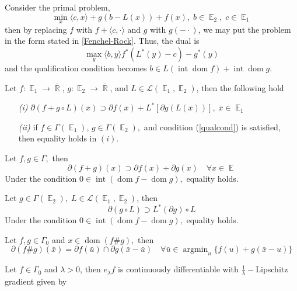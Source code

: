 \documentclass{tufte-handout}
\DeclareMathOperator{\dom}{dom}
\DeclareMathOperator{\argmin}{argmin}
\DeclareMathOperator{\R}{\mathbb{R}}
\DeclareMathOperator{\E}{\mathbb{E}}
\begin{document}
{{\begin{remark}
\end{remark}
\begin{example} Consider the primal problem, 
  $$\min_x \langle c,x \rangle + g(b - L(x)) + f(x), \; b \in \E_2, \; c \in \E_1 $$
  then by replacing $f$ with $f + \langle c , \cdot \rangle $ and $g$ with $g( - \cdot {} )$, we may put the problem in the form stated in \ref{Fenchel-Rock}. Thus, the dual is 
  $$\max_y \langle b,y \rangle  f^* (L^* (y) -c)- g^*(y) $$
  and the qualification condition becomes $b \in L(\operatorname{int}\dom f) + \operatorname{int}\dom g.  $
\end{example}
\begin{theorem} \label{sumrule}
  Let $f : \E_1 \to \overline{\R}$, $g: \E_2 \to \overline{\R}$, and $L \in \mathcal{L}(\E_1, \E_2)$, then the following hold
  \begin{enumerate}
    \item[\it (i)] $\partial( f + g \circ L) (\bar x) \supset \partial f(\bar x) + L^*[\partial g(L(\bar x))], \; \bar x \in \E_1$ 
    \item[\it (ii)] if $f\in \Gamma(\E_1)$, $g \in \Gamma(\E_2),$ and condition (\ref{qualcond}) is satisfied, then equality holds in $(i)$.
  \end{enumerate}
\end{theorem}
\begin{theorem}
  Let $f,g \in \Gamma, $ then $$\partial(f + g)(x)\supset \partial f(x) + \partial g(x)\quad \forall x \in \E $$
  Under the condition $0 \in \operatorname{int}(\dom f - \dom g), $
  equality holds. 
\end{theorem}
\begin{proposition}
  Let $g \in \Gamma (\E_2),\; L \in \mathcal{L}(\E_1,\E_2)$, then $$\partial (g \circ L ) \supset L^* (\partial g) \circ L$$Under the condition $0 \in \operatorname{int}(\dom f - \dom g), $
  equality holds.
\end{proposition}
\begin{theorem} \label{label}
  Let $f, g \in \Gamma_0$ and $x \in \dom(f\# g),$ then $$\partial (f\# g) (\bar x) = \partial f(\bar u )\cap \partial g(\bar x - \bar u) \quad \forall \bar u \in \argmin_u \{f(u) + g(\bar x -u)\} $$
\end{theorem}
\begin{corollary}
  Let $f \in \Gamma_0$ and $\lambda > 0$, then $e_\lambda f$ is continuously differentiable with $\frac{1}{\lambda}- $Lipschitz gradient given by

\end{corollary}}}
\end{document}
